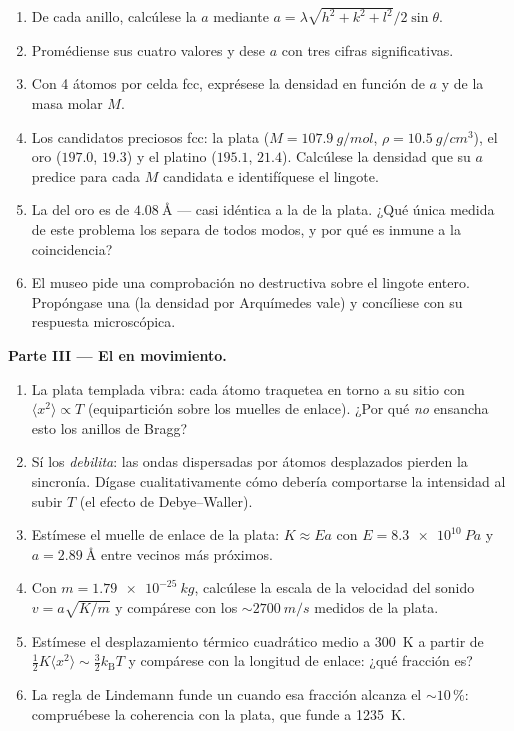 \begin{problem}
\begin{enumerate}[resume]
  \item De cada anillo, calcúlese la  $a$ mediante
        $a = \lambda\sqrt{h^2+k^2+l^2}/2\sin\theta$.
  \item Promédiense sus cuatro valores y dese $a$ con tres
        cifras significativas.
  \item Con 4 átomos por celda fcc, exprésese la densidad en función
        de $a$ y de la masa molar $M$.
  \item Los candidatos preciosos fcc: la plata
        ($M = \qty{107.9}{g/mol}$, $\rho = \qty{10.5}{g/cm^3}$),
        el oro ($197.0$, $19.3$) y el platino ($195.1$, $21.4$).
        Calcúlese la densidad que su $a$ predice para cada $M$
        candidata e identifíquese el lingote.
  \item La  del oro es de $\qty{4.08}{\angstrom}$ ---
        casi idéntica a la de la plata. ¿Qué única medida de
        este problema los separa de todos modos, y por qué es inmune
        a la coincidencia?
  \item El museo pide una comprobación no destructiva sobre el lingote
        entero. Propóngase una (la densidad por Arquímedes vale) y
        concíliese con su respuesta microscópica.
\end{enumerate}

\medskip\noindent\textbf{Parte III --- El  en movimiento.}

\begin{enumerate}[resume]
  \item La plata templada vibra: cada átomo traquetea en torno a su sitio
        con $\langle x^2\rangle \propto T$ (equipartición sobre los
        muelles de enlace). ¿Por qué \emph{no} ensancha esto los anillos
        de Bragg?
  \item Sí los \emph{debilita}: las ondas dispersadas por átomos desplazados
        pierden la sincronía. Dígase cualitativamente cómo debería
        comportarse la intensidad al subir $T$ (el efecto de
        Debye--Waller).
  \item Estímese el muelle de enlace de la plata: $K \approx Ea$ con
        $E = \qty{8.3e10}{Pa}$ y $a = \qty{2.89}{\angstrom}$
        entre vecinos más próximos.
  \item Con $m = \qty{1.79e-25}{kg}$, calcúlese la escala de la velocidad
        del sonido $v = a\sqrt{K/m}$ y compárese con los
        $\sim\qty{2700}{m/s}$ medidos de la plata.
  \item Estímese el desplazamiento térmico cuadrático medio a \qty{300}{K}
        a partir de $\tfrac12K\langle x^2\rangle \sim
        \tfrac32k_{\text{B}}T$ y compárese con la longitud
        de enlace: ¿qué fracción es?
  \item La regla de Lindemann funde un  cuando esa fracción
        alcanza el $\sim10\,\%$: compruébese la coherencia con la plata,
        que funde a \qty{1235}{K}.
\end{enumerate}


\end{problem}
